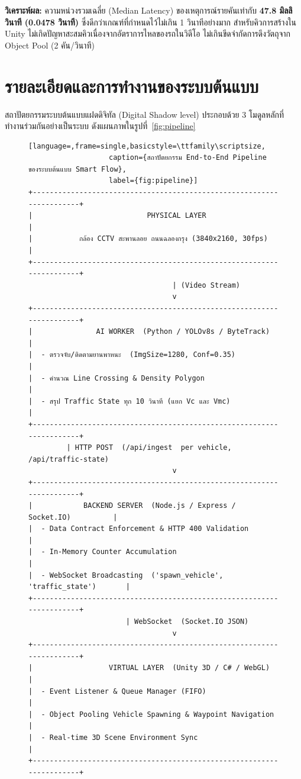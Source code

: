 \documentclass[12pt,a4paper]{report}
\begin{document}
\noindent\textbf{วิเคราะห์ผล:}
ความหน่วงรวมเฉลี่ย (Median Latency) ของเหตุการณ์รายคันเท่ากับ
\textbf{47.8 มิลลิวินาที (0.0478 วินาที)}
ซึ่งดีกว่าเกณฑ์ที่กำหนดไว้ไม่เกิน 1 วินาทีอย่างมาก
สำหรับคิวการสร้างใน Unity ไม่เกิดปัญหาสะสมคิวเนื่องจากอัตราการไหลของรถในวิดีโอ
ไม่เกินขีดจำกัดการดึงวัตถุจาก Object Pool (2 คัน/วินาที)

\section{รายละเอียดและการทำงานของระบบต้นแบบ}
\label{sec:prototype}

สถาปัตยกรรมระบบต้นแบบแฝดดิจิทัล (Digital Shadow level)
ประกอบด้วย 3 โมดูลหลักที่ทำงานร่วมกันอย่างเป็นระบบ
ดังแผนภาพในรูปที่~\ref{fig:pipeline}

\begin{figure}[H]
\begin{lstlisting}[language=,frame=single,basicstyle=\ttfamily\scriptsize,
                   caption={สถาปัตยกรรม End-to-End Pipeline ของระบบต้นแบบ Smart Flow},
                   label={fig:pipeline}]
+----------------------------------------------------------------------+
|                           PHYSICAL LAYER                             |
|           กล้อง CCTV สะพานลอย ถนนฉลองกรุง (3840x2160, 30fps)        |
+----------------------------------------------------------------------+
                                  | (Video Stream)
                                  v
+----------------------------------------------------------------------+
|               AI WORKER  (Python / YOLOv8s / ByteTrack)             |
|  - ตรวจจับ/ติดตามยานพาหนะ  (ImgSize=1280, Conf=0.35)                |
|  - คำนวณ Line Crossing & Density Polygon                             |
|  - สรุป Traffic State ทุก 10 วินาที (แยก Vc และ Vmc)                |
+----------------------------------------------------------------------+
         | HTTP POST  (/api/ingest  per vehicle, /api/traffic-state)
                                  v
+----------------------------------------------------------------------+
|            BACKEND SERVER  (Node.js / Express / Socket.IO)          |
|  - Data Contract Enforcement & HTTP 400 Validation                  |
|  - In-Memory Counter Accumulation                                   |
|  - WebSocket Broadcasting  ('spawn_vehicle', 'traffic_state')       |
+----------------------------------------------------------------------+
                       | WebSocket  (Socket.IO JSON)
                                  v
+----------------------------------------------------------------------+
|                  VIRTUAL LAYER  (Unity 3D / C# / WebGL)             |
|  - Event Listener & Queue Manager (FIFO)                            |
|  - Object Pooling Vehicle Spawning & Waypoint Navigation            |
|  - Real-time 3D Scene Environment Sync                              |
+----------------------------------------------------------------------+
\end{lstlisting}
\end{figure}
\end{document}

